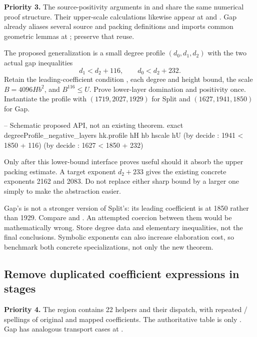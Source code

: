 \textbf{Priority 3.} The source-positivity arguments in
 and
 share the same numerical proof structure.
Their upper-scale calculations likewise appear at
 and
. Gap already aliases several source and
packing definitions and imports common geometric lemmas at
; preserve that reuse.

The proposed generalization is a small degree profile $(d_0,d_1,d_2)$ with
the two actual gap inequalities
\[
 d_1 < d_2 + 116,\qquad d_0 < d_2 + 232.
\]
Retain the leading-coefficient condition , each
degree and height bound, the scale $B=4096Hb^2$, and $B^{116}\le U$.
Prove lower-layer domination and positivity once. Instantiate the profile
with $(1719,2027,1929)$ for Split and $(1627,1941,1850)$ for Gap.

\begin{Lean}
-- Schematic proposed API, not an existing theorem.
exact degreeProfile_negative_layers hk.profile hH hb hscale hU
  (by decide : 1941 < 1850 + 116)
  (by decide : 1627 < 1850 + 232)
\end{Lean}

Only after this lower-bound interface proves useful should it absorb the
upper packing estimate. A target exponent $d_2+233$ gives the existing
concrete exponents 2162 and 2083. Do not replace either sharp bound by a
larger one simply to make the abstraction easier.

\risk{} Gap's  is not a stronger version of Split's:
its leading coefficient is at 1850 rather than 1929. Compare
 and
. An attempted coercion between them
would be mathematically wrong. Store degree data and elementary inequalities,
not the final conclusions. Symbolic exponents can also increase elaboration
cost, so benchmark both concrete specializations, not only the new theorem.

\subsection{Remove duplicated coefficient expressions in stages}
\label{sec:coefficients}

\textbf{Priority 4.} The region
 contains 22
 helpers and their dispatch, with repeated
/ spellings of original and mapped coefficients.
The authoritative table is only
. Gap has analogous transport
cases at .

